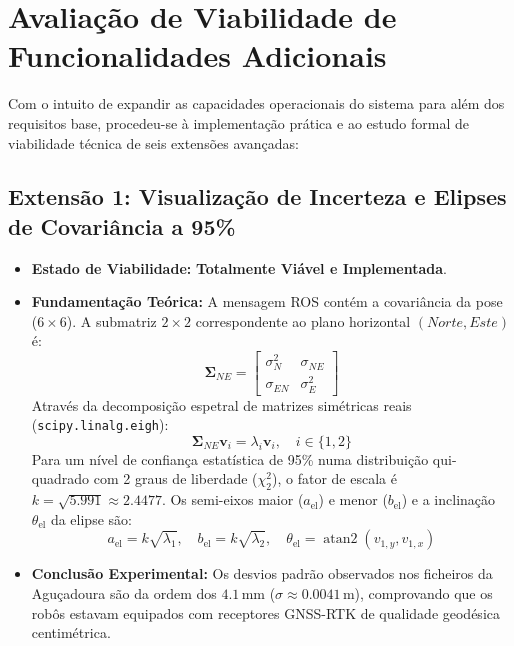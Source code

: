 \documentclass[11pt,a4paper]{article}
\begin{document}
\section{Avaliação de Viabilidade de Funcionalidades Adicionais}

Com o intuito de expandir as capacidades operacionais do sistema para além dos requisitos base, procedeu-se à implementação prática e ao estudo formal de viabilidade técnica de seis extensões avançadas:

\subsection{Extensão 1: Visualização de Incerteza e Elipses de Covariância a 95\%}
\begin{itemize}
    \item \textbf{Estado de Viabilidade:} \textbf{Totalmente Viável e Implementada}.
    \item \textbf{Fundamentação Teórica:} A mensagem ROS contém a covariância da pose ($6 \times 6$). A submatriz $2 \times 2$ correspondente ao plano horizontal $(Norte, Este)$ é:
    \begin{equation}
        \mathbf{\Sigma}_{NE} = \begin{bmatrix} \sigma_N^2 & \sigma_{NE} \\ \sigma_{EN} & \sigma_E^2 \end{bmatrix}
    \end{equation}
    Através da decomposição espetral de matrizes simétricas reais (\texttt{scipy.linalg.eigh}):
    \begin{equation}
        \mathbf{\Sigma}_{NE} \mathbf{v}_i = \lambda_i \mathbf{v}_i, \quad i \in \{1, 2\}
    \end{equation}
    Para um nível de confiança estatística de 95\% numa distribuição qui-quadrado com 2 graus de liberdade ($\chi_2^2$), o fator de escala é $k = \sqrt{5.991} \approx 2.4477$. Os semi-eixos maior ($a_{\text{el}}$) e menor ($b_{\text{el}}$) e a inclinação $\theta_{\text{el}}$ da elipse são:
    \begin{equation}
        a_{\text{el}} = k\sqrt{\lambda_1}, \quad b_{\text{el}} = k\sqrt{\lambda_2}, \quad \theta_{\text{el}} = \operatorname{atan2}(v_{1, y}, v_{1, x})
    \end{equation}
    \item \textbf{Conclusão Experimental:} Os desvios padrão observados nos ficheiros da Aguçadoura são da ordem dos $4.1\,\text{mm}$ ($\sigma \approx 0.0041\,\text{m}$), comprovando que os robôs estavam equipados com receptores GNSS-RTK de qualidade geodésica centimétrica.
\end{itemize}
\end{document}

